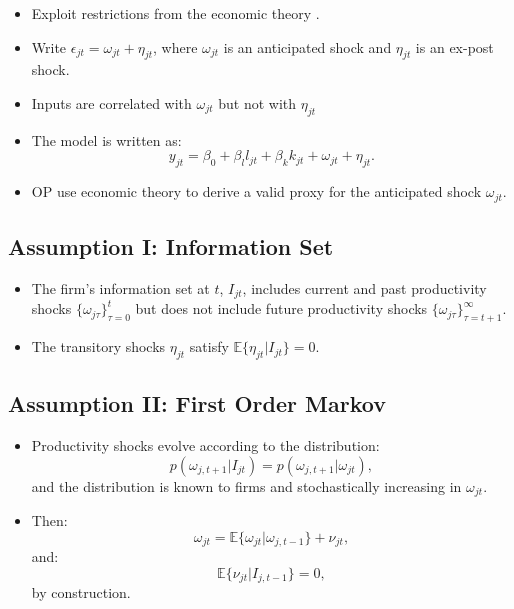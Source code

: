 \documentclass[
]{book}
\providecommand{\tightlist}{%
  \setlength{\itemsep}{0pt}\setlength{\parskip}{0pt}}
\begin{document}
\begin{itemize}
\tightlist
\item
  Exploit restrictions from the economic theory \citep{Olley1996}.
\item
  Write \(\epsilon_{jt} = \omega_{jt} + \eta_{jt}\), where \(\omega_{jt}\) is an anticipated shock and \(\eta_{jt}\) is an ex-post shock.
\item
  Inputs are correlated with \(\omega_{jt}\) but not with \(\eta_{jt}\)
\item
  The model is written as:
  \begin{equation}
  y_{jt} = \beta_0 + \beta_l l_{jt} + \beta_k k_{jt} + \omega_{jt} + \eta_{jt}.
  \end{equation}
\item
  OP use economic theory to derive a valid proxy for the anticipated shock \(\omega_{jt}\).
\end{itemize}

\hypertarget{assumption-i-information-set}{%
\subsection{Assumption I: Information Set}\label{assumption-i-information-set}}

\begin{itemize}
\tightlist
\item
  The firm's information set at \(t\), \(I_{jt}\), includes current and past productivity shocks \(\{\omega_{j\tau}\}_{\tau = 0}^t\) but does not include future productivity shocks \(\{\omega_{j\tau}\}_{\tau = t + 1}^{\infty}\).
\item
  The transitory shocks \(\eta_{jt}\) satisfy \(\mathbb{E}\{\eta_{jt}|I_{jt}\} = 0\).
\end{itemize}

\hypertarget{assumption-ii-first-order-markov}{%
\subsection{Assumption II: First Order Markov}\label{assumption-ii-first-order-markov}}

\begin{itemize}
\tightlist
\item
  Productivity shocks evolve according to the distribution:
  \begin{equation}
  p(\omega_{j, t + 1}|I_{jt}) = p(\omega_{j, t + 1}|\omega_{jt}), 
  \end{equation}
  and the distribution is known to firms and stochastically increasing in \(\omega_{jt}\).
\item
  Then:
  \begin{equation}
  \omega_{jt} = \mathbb{E}\{\omega_{jt}|\omega_{j, t - 1}\} + \nu_{jt},
  \end{equation}
  and:
  \begin{equation}
  \mathbb{E}\{\nu_{jt}|I_{j, t - 1}\} = 0,
  \end{equation}
  by construction.
\end{itemize}
\end{document}
